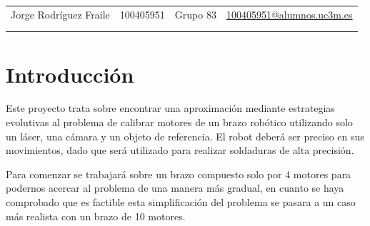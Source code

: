 \documentclass[12pt, spanish, pdftex]{UC3M_document}
\author{Jorge Rodríguez Fraile}
\begin{document}
\begin{titlepage}
	
	\begin{table}[b]
		\centering
		\begin{tabular}{ cccc }
			\large Jorge Rodríguez Fraile & \large 100405951 & \large Grupo 83 & \href{mailto:100405951@alumnos.uc3m.es}{\large 100405951@alumnos.uc3m.es} \\
			                              &                  &                 &                                                                           \\
			                              &                  &                 &                                                                           \\
		\end{tabular}
	\end{table}
	
\end{titlepage}

\newpage

\begin{spacing}{0.5}
	\hypersetup{linkcolor=black}    %
	\tableofcontents\newpage        %
	\listoffigures\newpage          %
	\listoftables\newpage           %
\end{spacing}


\section{Introducción}
Este proyecto trata sobre encontrar una aproximación mediante estrategias evolutivas al problema de calibrar motores de un brazo robótico utilizando solo un láser, una cámara y un objeto de referencia. El robot deberá ser preciso en sus movimientos, dado que será utilizado para realizar soldaduras de alta precisión.

Para comenzar se trabajará sobre un brazo compuesto solo por 4 motores para podernos acercar al problema de una manera más gradual, en cuanto se haya comprobado que es factible esta simplificación del problema se pasara a un caso más realista con un brazo de 10 motores.
\end{document}
